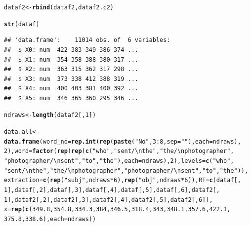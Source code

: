 \documentclass{article}\usepackage[]{graphicx}\usepackage[]{color}
\makeatletter
\newcommand{\hlnum}[1]{\textcolor[rgb]{0.686,0.059,0.569}{#1}}%
\newcommand{\hlstr}[1]{\textcolor[rgb]{0.192,0.494,0.8}{#1}}%
\newcommand{\hlopt}[1]{\textcolor[rgb]{0,0,0}{#1}}%
\newcommand{\hlstd}[1]{\textcolor[rgb]{0.345,0.345,0.345}{#1}}%
\newcommand{\hlkwb}[1]{\textcolor[rgb]{0.69,0.353,0.396}{#1}}%
\newcommand{\hlkwc}[1]{\textcolor[rgb]{0.333,0.667,0.333}{#1}}%
\newcommand{\hlkwd}[1]{\textcolor[rgb]{0.737,0.353,0.396}{\textbf{#1}}}%
\newenvironment{kframe}{%
 \def\at@end@of@kframe{}%
 \ifinner\ifhmode%
  \def\at@end@of@kframe{\end{minipage}}%
  \begin{minipage}{\columnwidth}%
 \fi\fi%
 \def\FrameCommand##1{\hskip\@totalleftmargin \hskip-\fboxsep
 \colorbox{shadecolor}{##1}\hskip-\fboxsep
     \hskip-\linewidth \hskip-\@totalleftmargin \hskip\columnwidth}%
 \MakeFramed {\advance\hsize-\width
   \@totalleftmargin\z@ \linewidth\hsize
   \@setminipage}}%
 {\par\unskip\endMakeFramed%
 \at@end@of@kframe}
\newenvironment{knitrout}{}{} %
\makeatother
\begin{document}
\begin{knitrout}
\begin{kframe}
\begin{alltt}
\hlstd{dataf2} \hlkwb{<-} \hlkwd{rbind}\hlstd{(dataf2, dataf2.c2)}

\hlkwd{str}\hlstd{(dataf)}
\end{alltt}
\begin{verbatim}
## 'data.frame':	11014 obs. of  6 variables:
##  $ X0: num  422 383 349 386 374 ...
##  $ X1: num  354 358 388 380 317 ...
##  $ X2: num  363 315 362 317 298 ...
##  $ X3: num  373 338 412 388 319 ...
##  $ X4: num  400 403 381 400 392 ...
##  $ X5: num  346 365 360 295 346 ...
\end{verbatim}
\begin{alltt}
\hlstd{ndraws} \hlkwb{<-} \hlkwd{length}\hlstd{(dataf2[,} \hlnum{1}\hlstd{])}

\hlstd{data.all} \hlkwb{<-} \hlkwd{data.frame}\hlstd{(}\hlkwc{word_no} \hlstd{=} \hlkwd{rep.int}\hlstd{(}\hlkwd{rep}\hlstd{(}\hlkwd{paste}\hlstd{(}\hlstr{"No"}\hlstd{,} \hlnum{3}\hlopt{:}\hlnum{8}\hlstd{,} \hlkwc{sep} \hlstd{=} \hlstr{""}\hlstd{),} \hlkwc{each} \hlstd{= ndraws),}
    \hlnum{2}\hlstd{),} \hlkwc{word} \hlstd{=} \hlkwd{factor}\hlstd{(}\hlkwd{rep}\hlstd{(}\hlkwd{rep}\hlstd{(}\hlkwd{c}\hlstd{(}\hlstr{"who"}\hlstd{,} \hlstr{"sent /\textbackslash{}nthe"}\hlstd{,} \hlstr{"the /\textbackslash{}nphotographer"}\hlstd{,}
    \hlstr{"photographer /\textbackslash{}nsent"}\hlstd{,} \hlstr{"to"}\hlstd{,} \hlstr{"the"}\hlstd{),} \hlkwc{each} \hlstd{= ndraws),} \hlnum{2}\hlstd{),} \hlkwc{levels} \hlstd{=} \hlkwd{c}\hlstd{(}\hlstr{"who"}\hlstd{,}
    \hlstr{"sent /\textbackslash{}nthe"}\hlstd{,} \hlstr{"the /\textbackslash{}nphotographer"}\hlstd{,} \hlstr{"photographer /\textbackslash{}nsent"}\hlstd{,} \hlstr{"to"}\hlstd{,} \hlstr{"the"}\hlstd{)),}
    \hlkwc{extraction} \hlstd{=} \hlkwd{c}\hlstd{(}\hlkwd{rep}\hlstd{(}\hlstr{"subj"}\hlstd{, ndraws} \hlopt{*} \hlnum{6}\hlstd{),} \hlkwd{rep}\hlstd{(}\hlstr{"obj"}\hlstd{, ndraws} \hlopt{*} \hlnum{6}\hlstd{)),} \hlkwc{RT} \hlstd{=} \hlkwd{c}\hlstd{(dataf[,}
        \hlnum{1}\hlstd{], dataf[,} \hlnum{2}\hlstd{], dataf[,} \hlnum{3}\hlstd{], dataf[,} \hlnum{4}\hlstd{], dataf[,} \hlnum{5}\hlstd{], dataf[,} \hlnum{6}\hlstd{], dataf2[,}
        \hlnum{1}\hlstd{], dataf2[,} \hlnum{2}\hlstd{], dataf2[,} \hlnum{3}\hlstd{], dataf2[,} \hlnum{4}\hlstd{], dataf2[,} \hlnum{5}\hlstd{], dataf2[,} \hlnum{6}\hlstd{]),}
    \hlkwc{x} \hlstd{=} \hlkwd{rep}\hlstd{(}\hlkwd{c}\hlstd{(}\hlnum{349.8}\hlstd{,} \hlnum{354.8}\hlstd{,} \hlnum{334.3}\hlstd{,} \hlnum{384}\hlstd{,} \hlnum{346.5}\hlstd{,} \hlnum{318.4}\hlstd{,} \hlnum{343}\hlstd{,} \hlnum{348.1}\hlstd{,} \hlnum{357.6}\hlstd{,} \hlnum{422.1}\hlstd{,}
        \hlnum{375.8}\hlstd{,} \hlnum{338.6}\hlstd{),} \hlkwc{each} \hlstd{= ndraws))}


\end{alltt}
\end{kframe}
\end{knitrout}
\end{document}
